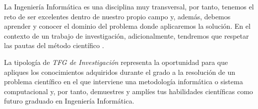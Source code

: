 La Ingeniería Informática es una disciplina muy transversal, por tanto, tenemos el reto de ser excelentes dentro de nuestro propio campo y, además, debemos aprender y conocer el dominio del problema donde aplicaremos la solución. En el contexto de un trabajo de investigación, adicionalmente, tendremos que respetar las pautas del método científico \cite{Chalmers2013}. 


La tipología de {\it TFG de Investigación} representa la oportunidad para que apliques los conocimientos adquiridos durante el grado a la resolución de un problema científico en el que interviene una metodología informática o sistema computacional y, por tanto, demuestres y amplíes tus habilidades científicas como futuro graduado en Ingeniería Informática.

